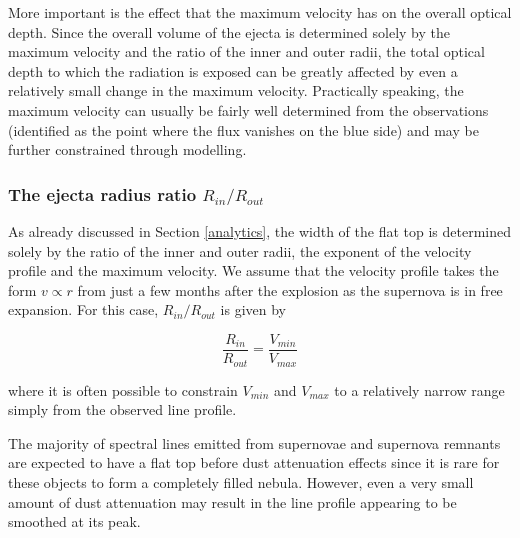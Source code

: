 \documentclass[useAMS,usenatbib,usegraphicx]{mnras}
\begin{document}
More important is the effect that the maximum velocity has on the overall 
optical depth.  Since the overall volume of the ejecta is determined 
solely by the maximum velocity and the ratio of the inner and outer radii, 
the total optical depth to which the radiation is exposed can be greatly 
affected by even a relatively small change in the maximum velocity.  
Practically speaking, the maximum velocity can usually be fairly well determined 
from the observations (identified as the point where the flux vanishes 
on the blue side) and may be further constrained through modelling.

\subsubsection{The ejecta radius ratio $R_{in}/R_{out}$}

As already discussed in Section \ref{analytics}, the width of the flat top 
is determined solely by the ratio of the inner and outer radii, the 
exponent of the velocity profile and the maximum velocity.  We 
assume that the velocity profile takes the form $v \propto r$ from 
just a few months after the explosion as the supernova is in free 
expansion.  For this case, $R_{in}/R_{out}$ is given by

\begin{equation}
\frac{R_{in}}{R_{out}}=\frac{V_{min}}{V_{max}}
\end{equation}

\noindent where it is often possible to constrain $V_{min}$ and $V_{max}$ 
to a relatively narrow range simply from the observed line profile.

The majority of spectral lines emitted from supernovae and supernova 
remnants are expected to have a flat top before dust attenuation effects since it is rare for these 
objects to form a completely filled nebula.  However, even a very small amount of 
dust attenuation may result in the line profile appearing to be smoothed at its 
peak.
\end{document}
